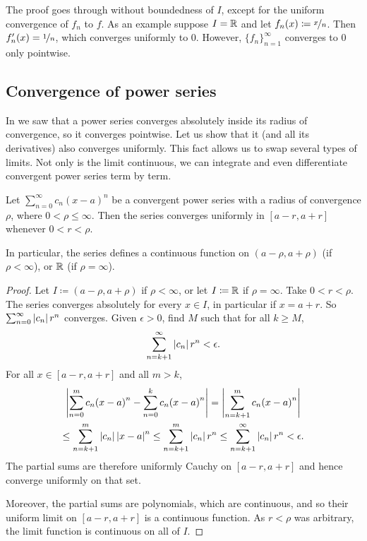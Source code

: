 The proof goes through without boundedness of $I$, except for the
uniform convergence of $f_n$ to $f$.  As an example suppose $I = {\mathbb{R}}$ and let
$f_n(x) \coloneqq \nicefrac{x}{n}$.  Then $f_n'(x)=\nicefrac{1}{n}$, which
converges uniformly to $0$.  However, $\{f_n\}_{n=1}^\infty$ converges to 0 only pointwise.

\subsection{Convergence of power series}

In  we saw that a power series converges
absolutely inside its radius of convergence, so it converges pointwise.
Let us show that it (and all its derivatives) also converges uniformly.
This fact allows us to
swap several types of limits.  Not only is the limit continuous,
we can
integrate and even differentiate convergent power series term by term.

\begin{prop}
Let $\sum_{n=0}^\infty c_n {(x-a)}^n$ be a convergent power series with a radius
of convergence $\rho$, where $0 < \rho \leq \infty$.
Then the series converges uniformly
in $[a-r,a+r]$ whenever $0 < r < \rho$.

In particular, the series defines a continuous function
on $(a-\rho,a+\rho)$ (if $\rho < \infty$), or ${\mathbb{R}}$ (if $\rho = \infty$).
\end{prop}

\begin{proof}
Let $I \coloneqq (a-\rho,a+\rho)$ if $\rho < \infty$,
or let $I \coloneqq {\mathbb{R}}$ if $\rho= \infty$.
Take $0 < r < \rho$.
The series converges absolutely for every $x \in I$,
in particular if $x = a+r$.
So $\sum_{n=0}^\infty \left\lvert {c_n} \right\rvert r^n$ converges.
Given $\epsilon >0$, find $M$ such that for all $k \geq M$,
\begin{equation*}
\sum_{n=k+1}^\infty \left\lvert {c_n} \right\rvert {r}^n < \epsilon .
\end{equation*}
For all $x \in [a-r,a+r]$ and all $m > k$,
\begin{multline*}
\left\lvert {\sum_{n=0}^m c_n {(x-a)}^n - 
\sum_{n=0}^k c_n {(x-a)}^n} \right\rvert
=
\left\lvert {\sum_{n=k+1}^m c_n {(x-a)}^n} \right\rvert
\\
\leq
\sum_{n=k+1}^m \left\lvert {c_n} \right\rvert {\left\lvert {x-a} \right\rvert}^n
\leq
\sum_{n=k+1}^m \left\lvert {c_n} \right\rvert {r}^n
\leq
\sum_{n=k+1}^\infty \left\lvert {c_n} \right\rvert {r}^n
<\epsilon.
\end{multline*}
The partial sums are therefore uniformly Cauchy on $[a-r,a+r]$ and
hence converge uniformly on that set.

Moreover, the partial sums are polynomials, which are
continuous, and so their uniform limit on $[a-r,a+r]$
is a continuous function.
As $r < \rho$ was arbitrary, the limit function
is continuous on all of $I$.
\end{proof}


